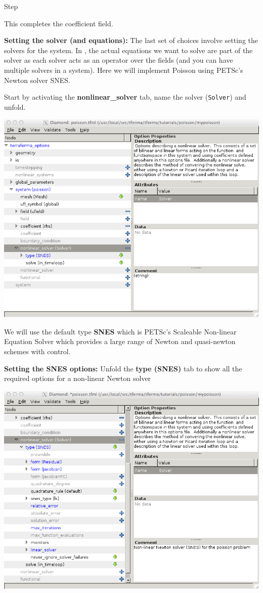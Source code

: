 \begin{steps}{Step}
\begin{center}
\end{center}
This completes the coefficient field.
\item \textbf{Setting the solver (and equations):}  The last set of
  choices involve setting the solvers for the system.  In \TF{}, the
  actual equations we want to solve are part of the solver as each
  solver acts as an operator over the fields (and you can have
  multiple solvers in a system).  Here we will implement Poisson using
  PETSc's Newton solver SNES.  

Start by activating the \textbf{nonlinear\_solver} tab, name the
solver (\texttt{Solver}) and unfold.
\begin{center}
    \includegraphics[width=\diamondwidth]{figures/screendumps/diamond_poisson_11a.png}
\end{center}
We will use the default type \textbf{SNES} which is PETSc's Scaleable
Non-linear Equation Solver which provides a large range of Newton and
quasi-newton schemes with control.
\item \textbf{Setting the SNES options:} Unfold the \textbf{type
    (SNES)} tab to show all the required options for a non-linear
 Newton  solver
\begin{center}
    \includegraphics[width=\diamondwidth]{figures/screendumps/diamond_poisson_11b.png}

\end{center}
\end{steps}
